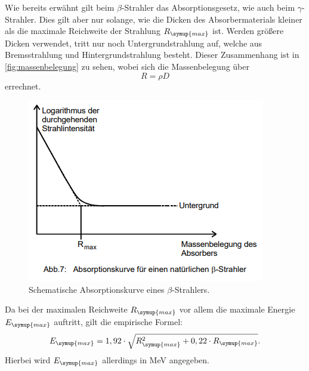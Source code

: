 Wie bereits erwähnt gilt beim $\beta$-Strahler das Absorptionsgesetz, wie auch beim $\gamma$-Strahler. Dies gilt aber nur solange, wie die 
Dicken des Absorbermaterials kleiner als die maximale Reichweite der Strahlung $R_{\symup{max}}$ ist. Werden größere Dicken verwendet, 
tritt nur noch Untergrundstrahlung auf, welche aus Bremsstrahlung und Hintergrundstrahlung besteht. Dieser Zusammenhang ist in \autoref{fig:massenbelegung}
zu sehen, wobei sich die Massenbelegung über 
\begin{equation}
    \label{eqn:massenbelegung}
    R = \rho D
\end{equation}
errechnet. 
\begin{figure}
        \centering
        \includegraphics[width=\textwidth]{content/absorption.png}
        \caption{Schematische Absorptionskurve eines $\beta$-Strahlers\cite[241]{V704}.}
        \label{fig:massenbelegung}
    \end{figure}
Da bei der maximalen Reichweite $R_{\symup{max}}$ vor allem die maximale Energie $E_{\symup{max}}$ auftritt, gilt die empirische Formel:
\begin{equation}
    \label{eqn:max_energie}    
    E_{\symup{max}} = 1,92 \cdot \sqrt{R_{\symup{max}}^2 + 0,22 \cdot R_{\symup{max}}}.
\end{equation}
Hierbei wird $E_{\symup{max}}$ allerdings in MeV angegeben.